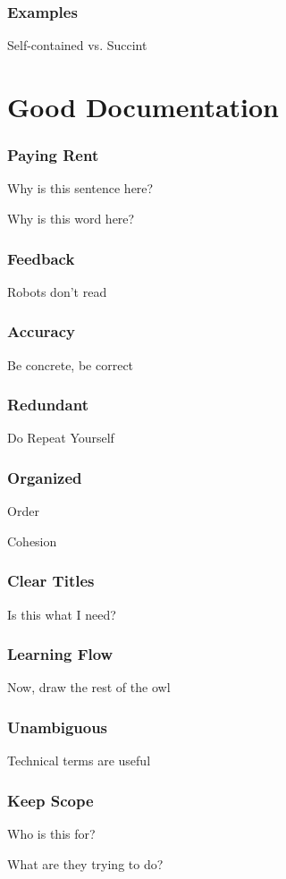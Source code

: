 \begin{frame}
\frametitle{Examples}

Self-contained vs. Succint
\end{frame}

\section{Good Documentation}


\begin{frame}
\frametitle{Paying Rent}

Why is this sentence here?

Why is this word here?

\end{frame}

\begin{frame}
\frametitle{Feedback}

Robots don't read
\end{frame}


\begin{frame}
\frametitle{Accuracy}

Be concrete, be correct

\end{frame}

\begin{frame}
\frametitle{Redundant}

Do Repeat Yourself
\end{frame}


\begin{frame}
\frametitle{Organized}

Order

Cohesion
\end{frame}

\begin{frame}
\frametitle{Clear Titles}

Is this what I need?
\end{frame}


\begin{frame}
\frametitle{Learning Flow}

Now, draw the rest of the owl
\end{frame}


\begin{frame}
\frametitle{Unambiguous}

Technical terms are useful
\end{frame}

\begin{frame}
\frametitle{Keep Scope}

Who is this for?

What are they trying to do?
\end{frame}

